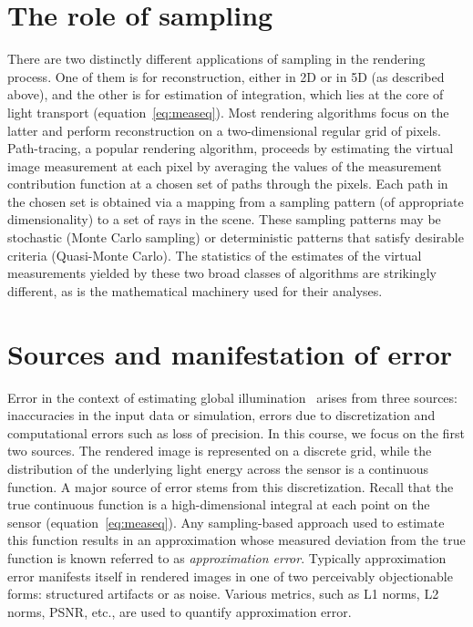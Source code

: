 \documentclass[11pt,fleqn]{book} %
\newcommand{\TBC} {\vspace {1em} \noindent [TO BE COMPLETED IN THE FINAL VERSION.] \vspace {1em}}
\begin{document}
\section{The role of sampling}
There are two distinctly different applications of sampling in the rendering process. One of them is for reconstruction, either in 2D or in 5D (as described above), and the other is for estimation of integration, which lies at the core of light transport (equation~\ref{eq:measeq}). Most rendering algorithms focus on the latter and perform reconstruction on a two-dimensional regular grid of pixels. Path-tracing, a popular rendering algorithm, proceeds by estimating the virtual image measurement at each pixel by averaging the values of the measurement contribution function at a chosen set of paths through the pixels. Each path in the chosen set is obtained via a mapping from a sampling pattern (of appropriate dimensionality) to a set of rays in the scene. These sampling patterns may be stochastic (Monte Carlo sampling) or deterministic patterns that satisfy desirable criteria (Quasi-Monte Carlo). The statistics of the estimates of the virtual measurements yielded by these two broad classes of algorithms are strikingly different, as is the mathematical machinery used for their analyses.  

\TBC

\section{Sources and manifestation of error}
Error in the context of estimating global illumination~\cite{Arvo94} arises from three sources: inaccuracies in the  input data or simulation, errors due to discretization and computational errors such as loss of precision. In this course, we focus on the first two sources. The rendered image is represented on a discrete grid, while the distribution of the underlying light energy across the sensor is a continuous function. A major source of error stems from this discretization. Recall that the true continuous function is a high-dimensional integral at each point on the sensor (equation~\ref{eq:measeq}). Any sampling-based approach used to estimate this function results in an approximation whose measured deviation from the true function is known referred to as \textit{approximation error}. Typically approximation error manifests itself in rendered images in one of two perceivably objectionable forms: structured artifacts or as noise. Various metrics, such as L1 norms, L2 norms, PSNR, etc., are used to quantify approximation error.
\end{document}
